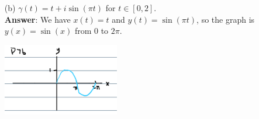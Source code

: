\documentclass{article}
\begin{document}
\begin{itemize}
\begin{itemize}
\begin{center}
                        \end{center}
                  \item [(b)] $\gamma(t)=t+i\sin(\pi t)$ for $t\in[0,2]$.\\\textbf{Answer}: We have $x(t)=t$ and $y(t)=\sin(\pi t)$, so the graph is $y(x)=\sin(x)$ from $0$ to $2\pi$.
                        \begin{center}
                              \includegraphics[width=2in]{P7b.png}
                        \end{center}
            \end{itemize}
\end{itemize}
\end{document}
